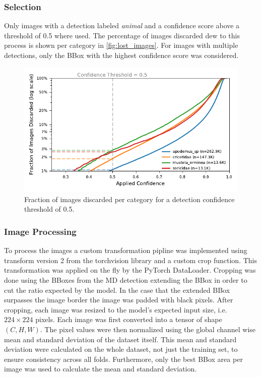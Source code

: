         \subsubsection{Selection}
        Only images with a detection labeled \textit{animal} and a confidence score above a threshold of 0.5 where used.
        The percentage of images discarded dew to this process is shown per category in \autoref{fig:lost_images}.
        For images with multiple detections, only the BBox with the highest confidence score was considered.

        \begin{figure}[ht]
        \centering
        \includegraphics{figures/discarded_img_by_conf.pdf}
        \caption{Fraction of images discarded per category for a detection confidence threshold of 0.5.}
        \label{fig:lost_images}
        \end{figure}        

        \subsubsection{Image Processing}
        To process the images a custom transformation pipline was implemented using transform version 2 from the torchvision library and a custom crop function.
        This transformation was applied on the fly by the PyTorch DataLoader.
        Cropping was done using the BBoxes from the MD detection extending the BBox in order to cut the ratio expected by the model.
        In the case that the extended BBox surpasses the image border the image was padded with black pixels.
        After cropping, each image was resized to the model's expected input size, i.e.\ \(224\times224\) pixels.
        Each image was first converted into a tensor of shape \((C,H,W)\). 
        The pixel values were then normalized using the global channel wise mean and standard deviation of the dataset itself.
        This mean and standard deviation were calculated on the whole dataset, not just the training set, to ensure consistency across all folds.
        Furthermore, only the best BBox area per image was used to calculate the mean and standard deviation.

